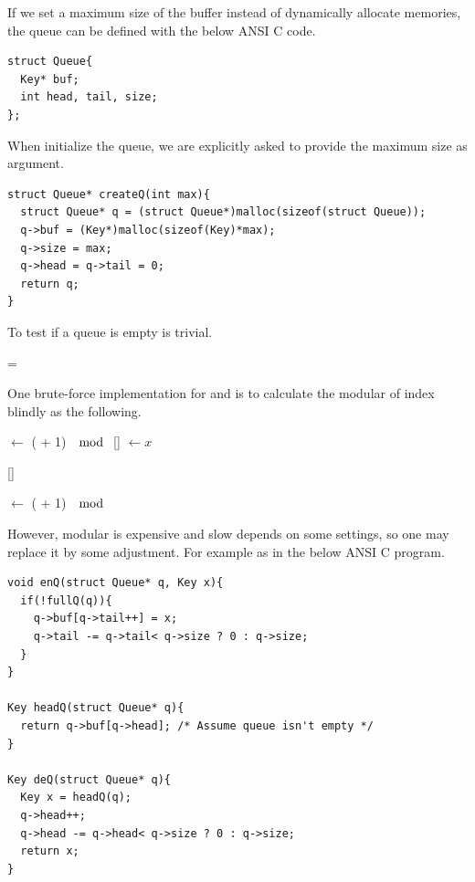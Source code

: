 \documentclass{article}
\begin{document}
If we set a maximum size of the buffer instead of dynamically allocate 
memories, the queue can be defined with the below ANSI C code.

\lstset{language=C}
\begin{lstlisting}
struct Queue{
  Key* buf;
  int head, tail, size;
};
\end{lstlisting}

When initialize the queue, we are explicitly asked to provide the maximum
size as argument.

\begin{lstlisting}
struct Queue* createQ(int max){
  struct Queue* q = (struct Queue*)malloc(sizeof(struct Queue));
  q->buf = (Key*)malloc(sizeof(Key)*max);
  q->size = max;
  q->head = q->tail = 0;
  return q;
}
\end{lstlisting}

To test if a queue is empty is trivial.

\begin{algorithmic}
  \State \Return {} = 
\EndFunction
\end{algorithmic}

One brute-force implementation for  and 
is to calculate the modular of index blindly as the following.

\begin{algorithmic}
    \State {} $\gets $ ( + 1) $\mod$ 
    \State {}[] $\gets x$
  \EndIf
\EndFunction
\end{algorithmic}

\begin{algorithmic}
    \State \Return {}[]
  \EndIf
\EndFunction
\end{algorithmic}

\begin{algorithmic}
    \State {} $\gets $ ( + 1) $\mod$ 
  \EndIf
\EndFunction
\end{algorithmic}

However, modular is expensive and slow depends on some settings, so one
may replace it by some adjustment. For example as in the below ANSI C
program.

\begin{lstlisting}
void enQ(struct Queue* q, Key x){
  if(!fullQ(q)){
    q->buf[q->tail++] = x;
    q->tail -= q->tail< q->size ? 0 : q->size;
  }
}

Key headQ(struct Queue* q){
  return q->buf[q->head]; /* Assume queue isn't empty */
}

Key deQ(struct Queue* q){
  Key x = headQ(q);
  q->head++;
  q->head -= q->head< q->size ? 0 : q->size;
  return x;
}
\end{lstlisting}
\end{document}
